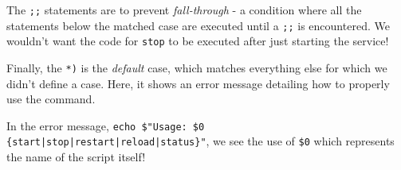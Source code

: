 The \verb|;;| statements are to prevent \textit{fall-through} - a condition where all the statements below the matched case are executed until a \verb|;;| is encountered. We wouldn't want the code for \verb|stop| to be executed after just starting the service!

Finally, the \verb|*)| is the \textit{default} case, which matches everything else for which we didn't define a case. Here, it shows an error message detailing how to properly use the command. 

In the error message, \verb~echo $"Usage: $0 {start|stop|restart|reload|status}"~, we see the use of \verb|$0| which represents the name of the script itself! 